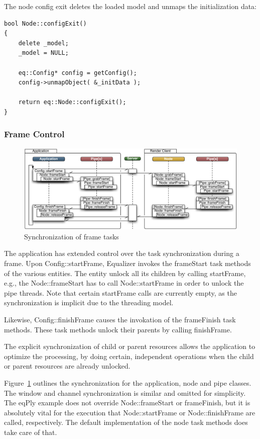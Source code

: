\documentclass[10pt,a4]{scrartcl}
\newcommand{\fig}[1]{Figure~\ref{#1}}
\begin{document}
The node config exit deletes the loaded model and unmaps the
initialization data: 

{\footnotesize\begin{lstlisting}
bool Node::configExit()
{
    delete _model;
    _model = NULL;

    eq::Config* config = getConfig();
    config->unmapObject( &_initData );

    return eq::Node::configExit();
}
\end{lstlisting}}

\subsubsection{Frame Control}

\begin{figure}
  \includegraphics[width=.6\textwidth]{images/mainloop.pdf}
  {\caption{\small\label{fFrameSync}Synchronization of frame tasks}}
\end{figure}
The application has extended control over the task synchronization
during a frame. Upon \textsf{Config::startFrame}, Equalizer invokes the
\textsf{frameStart} task methods of the various entities. The entity
unlock all its children by calling \textsf{startFrame}, e.g., the
\textsf{Node::frameStart} has to call \textsf{Node::startFrame} in order
to unlock the pipe threads. Note that certain \textsf{startFrame} calls
are currently empty, as the synchronization is implicit due to the
threading model.

Likewise, \textsf{Config::finishFrame} causes the invokation of the
\textsf{frameFinish} task methods. These task methods unlock their
parents by calling \textsf{finishFrame}.

The explicit synchronization of child or parent resources allows the
application to optimize the processing, by doing certain, independent
operations when the child or parent resources are already unlocked.

\fig{fFrameSync} outlines the synchronization for the application, node
and pipe classes. The window and channel synchronization is similar and
omitted for simplicity. The \textsf{eqPly} example does not override
\textsf{Node::frameStart} or \textsf{frameFinish}, but it is absolutely
vital for the execution that \textsf{Node::startFrame} or
\textsf{Node::finishFrame} are called, respectively. The default
implementation of the node task methods does take care of that.
\end{document}
